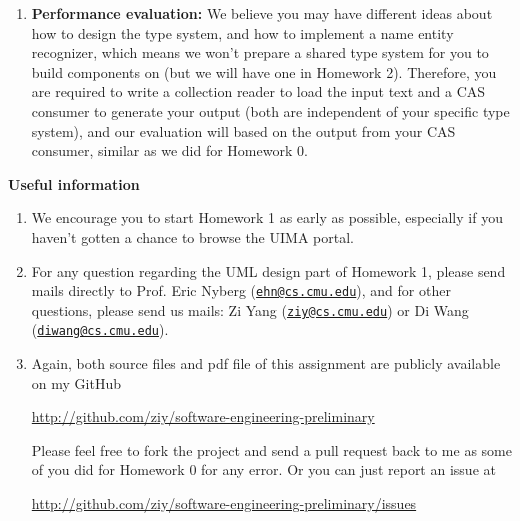 \documentclass[oneside]{memoir}
\begin{document}
\begin{titlingpage}
\begin{minipage}{1.2\textwidth}
\begin{enumerate}
\item \textbf{Performance evaluation:} We believe you may have different ideas
about how to design the type system, and how to implement a name entity
recognizer, which means we won't prepare a shared type system for you to build
components on (but we will have one in Homework 2). Therefore, you are required
to write a collection reader to load the input text and a CAS consumer to
generate your output (both are independent of your specific type system), and
our evaluation will based on the output from your CAS consumer, similar as we
did for Homework 0.

\end{enumerate}

\textbf{Useful information}
\begin{enumerate}
\item We encourage you to start Homework 1 as early as possible, especially if
you haven't gotten a chance to browse the UIMA portal.

\item For any question regarding the UML design part of Homework 1, please send
mails directly to Prof. Eric Nyberg
(\href{mailto:ehn@cs.cmu.edu}{\nolinkurl{ehn@cs.cmu.edu}}), and for other
questions, please send us mails: Zi Yang
(\href{mailto:ziy@cs.cmu.edu}{\nolinkurl{ziy@cs.cmu.edu}}) or Di Wang
(\href{mailto:diwang@cs.cmu.edu}{\nolinkurl{diwang@cs.cmu.edu}}).

\item Again, both source files and pdf file of this assignment are
publicly available on my GitHub

\url{http://github.com/ziy/software-engineering-preliminary}

Please feel free to fork the project and send a pull request back to me as some
of you did for Homework 0 for any error. Or you can just report an issue at

\url{http://github.com/ziy/software-engineering-preliminary/issues}

\end{enumerate}

\end{minipage}
\hspace{-0.1\textwidth}

\end{titlingpage}








\end{document}
